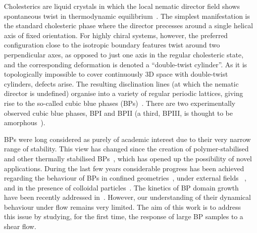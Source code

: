 \documentclass[aps,pre,reprint,superscriptaddress, twocolumn]{revtex4}
\begin{document}
Cholesterics are liquid crystals in which the local nematic director field shows spontaneous 
twist in thermodynamic equilibrium~\cite{deGennes}. 
The simplest manifestation is the standard cholesteric phase where the
director precesses around a single helical axis of fixed orientation.
For highly chiral systems, however,
the preferred configuration close 
to the isotropic boundary features twist around two perpendicular axes, as opposed to 
just one axis in the regular cholesteric state, and the corresponding deformation is 
denoted a ``double-twist cylinder''.
As it is topologically impossible to cover continuously 3D space with double-twist 
cylinders, defects arise. The resulting disclination lines (at which the
nematic director is undefined)
 organise into a variety of regular periodic lattices, 
giving rise to the so-called cubic blue phases (BPs)~\cite{Grebel:1984,Wright:1989}. 
There are two experimentally observed cubic blue phases, BPI and BPII (a third, BPIII, 
is thought to be amorphous~\cite{Henrich:2011a}).

BPs were long considered as purely of academic interest due to their very narrow 
range of stability. This view has changed since the creation of polymer-stabilised and other thermally 
stabilised BPs~\cite{Kikuchi:2002,Coles:2005}, which has opened up the 
possibility of novel applications.
During the last few years considerable progress has been achieved regarding the behaviour 
of BPs in confined geometries~\cite{Fukuda:2010a, Fukuda:2010b, Ravnik:2011b}, under 
external fields ~\cite{Alexander:2008,Fukuda:2009,Henrich:2010a,Castles:2010,Tiribocchi:2011a}, 
and in the presence of colloidal particles~\cite{Ravnik:2011a}.
The kinetics of BP domain growth have been recently addressed in~\cite{Henrich:2010b}. 
However, our understanding of their dynamical behaviour under flow remains
very limited. The aim of this work is to address this issue by studying,
for the first time, the response of large BP samples to a shear flow.
\end{document}
